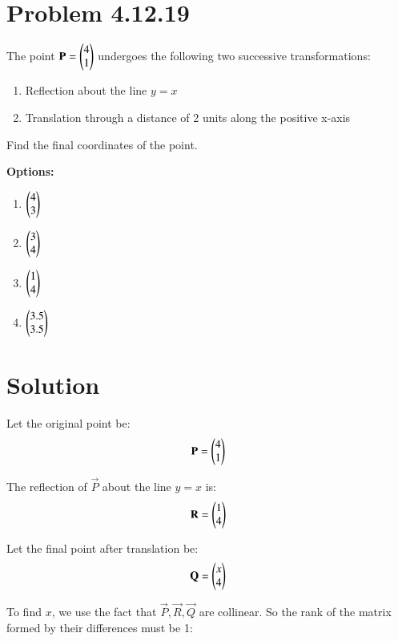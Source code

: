 \documentclass[journal]{IEEEtran}
\begin{document}

\vspace{3cm}

\section*{\large\textbf{Problem 4.12.19}}

The point \( \mathbf{P} = \begin{pmatrix}4 \\ 1\end{pmatrix} \) undergoes the following two successive transformations:

\begin{enumerate}
    \item Reflection about the line \( y = x \)
    \item Translation through a distance of 2 units along the positive x-axis
\end{enumerate}

Find the final coordinates of the point.

\textbf{Options:}
\begin{enumerate}[label=\alph*)]
    \item \( \begin{pmatrix}4 \\ 3\end{pmatrix} \) \vspace{0.2cm}
    \item \( \begin{pmatrix}3 \\ 4\end{pmatrix} \) \vspace{0.2cm}
    \item \( \begin{pmatrix}1 \\ 4\end{pmatrix} \) \vspace{0.2cm}
    \item \( \begin{pmatrix}3.5 \\ 3.5\end{pmatrix} \)
\end{enumerate}

\section*{\large\textbf{Solution}}

Let the original point be:
\[
\mathbf{P} = \begin{pmatrix}4 \\ 1\end{pmatrix}
\]

The reflection of \( \vec{P} \) about the line \( y = x \) is:
\[
\mathbf{R} = \begin{pmatrix}1 \\ 4\end{pmatrix}
\]

Let the final point after translation be:
\[
\mathbf{Q} = \begin{pmatrix}x \\ 4\end{pmatrix}
\]

To find \( x \), we use the fact that \( \vec{P}, \vec{R}, \vec{Q} \) are collinear. So the rank of the matrix formed by their differences must be 1:
\end{document}
